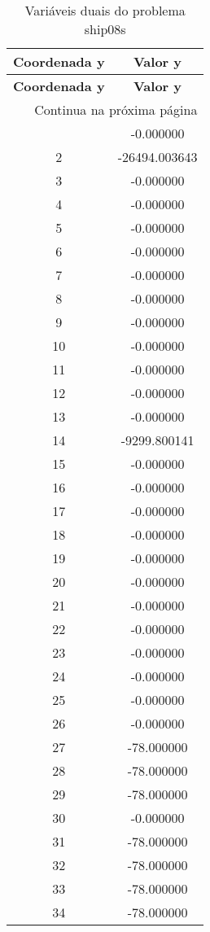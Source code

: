 \documentclass[12pt]{article}
\begin{document}
\begin{longtable}{@{}cc@{}}
\caption{Variáveis duais do problema ship08s} \\
\toprule
\textbf{Coordenada y} & \textbf{Valor y} \\
\midrule
\endfirsthead

\toprule
\textbf{Coordenada y} & \textbf{Valor y} \\
\midrule
\endhead

\midrule \multicolumn{2}{r}{{Continua na próxima página}} \\ \midrule
\endfoot

\bottomrule
\endlastfoot
1 & -0.000000 \\
2 & -26494.003643 \\
3 & -0.000000 \\
4 & -0.000000 \\
5 & -0.000000 \\
6 & -0.000000 \\
7 & -0.000000 \\
8 & -0.000000 \\
9 & -0.000000 \\
10 & -0.000000 \\
11 & -0.000000 \\
12 & -0.000000 \\
13 & -0.000000 \\
14 & -9299.800141 \\
15 & -0.000000 \\
16 & -0.000000 \\
17 & -0.000000 \\
18 & -0.000000 \\
19 & -0.000000 \\
20 & -0.000000 \\
21 & -0.000000 \\
22 & -0.000000 \\
23 & -0.000000 \\
24 & -0.000000 \\
25 & -0.000000 \\
26 & -0.000000 \\
27 & -78.000000 \\
28 & -78.000000 \\
29 & -78.000000 \\
30 & -0.000000 \\
31 & -78.000000 \\
32 & -78.000000 \\
33 & -78.000000 \\
34 & -78.000000 \\

\end{longtable}
\end{document}

